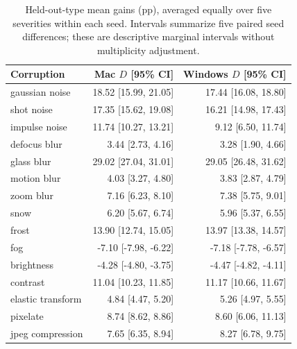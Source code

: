 \begin{table}[!htbp]
\centering
\small
\setlength{\tabcolsep}{5pt}
\caption{Held-out-type mean gains (pp), averaged equally over five severities within each seed. Intervals summarize five paired seed differences; these are descriptive marginal intervals without multiplicity adjustment.}
\label{tab:types}
\begin{tabular}{lrr}
\toprule
Corruption & Mac $D$ [95\% CI] & Windows $D$ [95\% CI] \\
\midrule
gaussian noise & 18.52 [15.99, 21.05] & 17.44 [16.08, 18.80] \\
shot noise & 17.35 [15.62, 19.08] & 16.21 [14.98, 17.43] \\
impulse noise & 11.74 [10.27, 13.21] & 9.12 [6.50, 11.74] \\
defocus blur & 3.44 [2.73, 4.16] & 3.28 [1.90, 4.66] \\
glass blur & 29.02 [27.04, 31.01] & 29.05 [26.48, 31.62] \\
motion blur & 4.03 [3.27, 4.80] & 3.83 [2.87, 4.79] \\
zoom blur & 7.16 [6.23, 8.10] & 7.38 [5.75, 9.01] \\
snow & 6.20 [5.67, 6.74] & 5.96 [5.37, 6.55] \\
frost & 13.90 [12.74, 15.05] & 13.97 [13.38, 14.57] \\
fog & -7.10 [-7.98, -6.22] & -7.18 [-7.78, -6.57] \\
brightness & -4.28 [-4.80, -3.75] & -4.47 [-4.82, -4.11] \\
contrast & 11.04 [10.23, 11.85] & 11.17 [10.66, 11.67] \\
elastic transform & 4.84 [4.47, 5.20] & 5.26 [4.97, 5.55] \\
pixelate & 8.74 [8.62, 8.86] & 8.60 [6.06, 11.13] \\
jpeg compression & 7.65 [6.35, 8.94] & 8.27 [6.78, 9.75] \\
\bottomrule
\end{tabular}
\end{table}
